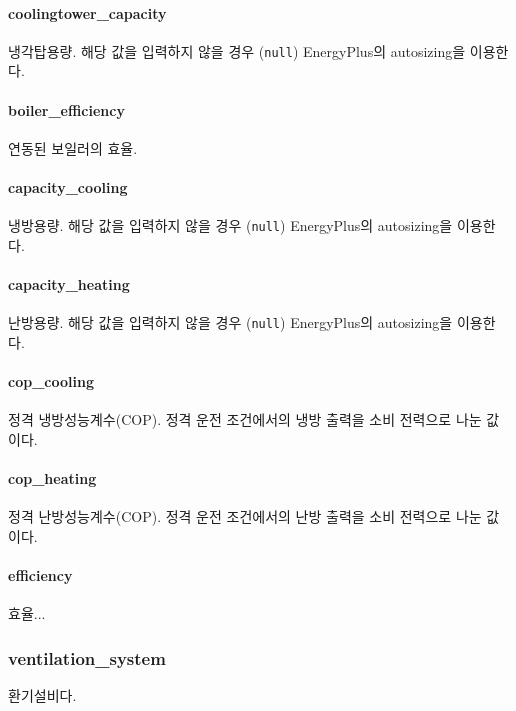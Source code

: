 \paragraph{coolingtower\_capacity} 냉각탑용량. 해당 값을 입력하지 않을 경우 (\texttt{null}) EnergyPlus의 autosizing을 이용한다.

\paragraph{boiler\_efficiency} 연동된 보일러의 효율.

\paragraph{capacity\_cooling} 냉방용량. 해당 값을 입력하지 않을 경우 (\texttt{null}) EnergyPlus의 autosizing을 이용한다.

\paragraph{capacity\_heating} 난방용량. 해당 값을 입력하지 않을 경우 (\texttt{null}) EnergyPlus의 autosizing을 이용한다.

\paragraph{cop\_cooling} 정격 냉방성능계수(COP). 정격 운전 조건에서의 냉방 출력을 소비 전력으로 나눈 값이다.

\paragraph{cop\_heating} 정격 난방성능계수(COP). 정격 운전 조건에서의 난방 출력을 소비 전력으로 나눈 값이다.

\paragraph{efficiency} 효율...

\subsubsection{ventilation\_system} \label{subsubsection:ioref:ventilationsystem}
환기설비다.



